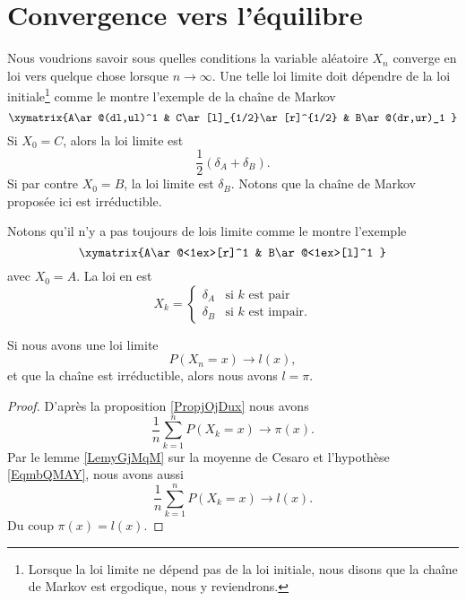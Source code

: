 \section{Convergence vers l'équilibre}

Nous voudrions savoir sous quelles conditions la variable aléatoire \( X_n\) converge en loi vers quelque chose lorsque \( n\to \infty\). Une telle loi limite doit dépendre de la loi initiale\footnote{Lorsque la loi limite ne dépend pas de la loi initiale, nous disons que la chaîne de Markov est ergodique, nous y reviendrons.} comme le montre l'exemple de la chaîne de Markov
\begin{equation}
\xymatrix{%
A\ar@(dl,ul)^1  & C\ar[l]_{1/2}\ar[r]^{1/2} &  B\ar@(dr,ur)_1
   }
\end{equation}
Si \( X_0=C\), alors la loi limite est
\begin{equation}
    \frac{ 1 }{2}(\delta_A+\delta_B).
\end{equation}
Si par contre \( X_0=B\), la loi limite est \(\delta_B\). Notons que la chaîne de Markov proposée ici est irréductible.

Notons qu'il n'y a pas toujours de lois limite comme le montre l'exemple
\begin{equation}
    \xymatrix{%
        A\ar@<1ex>[r]^1  & B\ar@<1ex>[l]^1
       }
\end{equation}
avec \( X_0=A\). La loi en est
\begin{equation}
    X_k=\begin{cases}
        \delta_A    &   \text{si } k\text{ est pair}\\
        \delta_B    &    \text{si } k\text{ est impair}.
    \end{cases}
\end{equation}

\begin{lemma}
    Si nous avons une loi limite
    \begin{equation}    \label{EqmbQMAY}
        P(X_n=x)\to l(x),
    \end{equation}
    et que la chaîne est irréductible, alors nous avons \( l=\pi\).
\end{lemma}

\begin{proof}
    D'après la proposition \ref{PropjOjDux} nous avons
    \begin{equation}
        \frac{1}{ n }\sum_{k=1}^nP(X_k=x)\to \pi(x).
    \end{equation}
    Par le lemme \ref{LemyGjMqM} sur la moyenne de Cesaro et l'hypothèse \eqref{EqmbQMAY}, nous avons aussi
    \begin{equation}
        \frac{1}{ n }\sum_{k=1}^nP(X_k=x)\to l(x).
    \end{equation}
    Du coup \( \pi(x)=l(x)\).
\end{proof}

